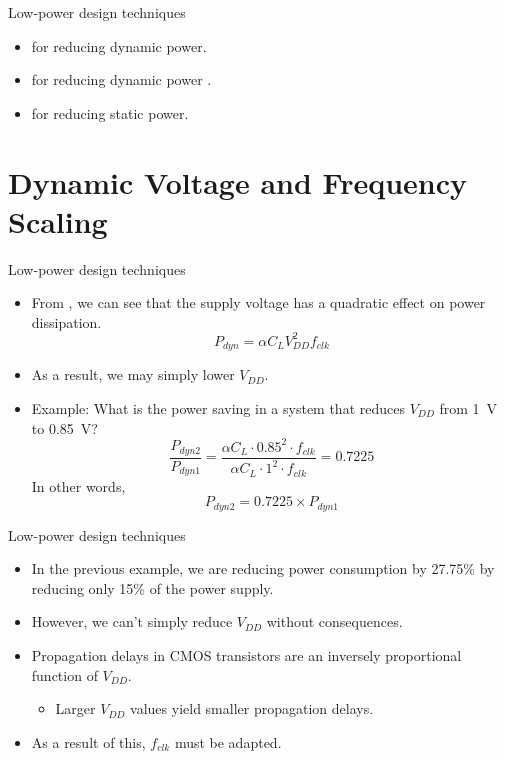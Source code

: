 \documentclass[]{slides}
\begin{document}
\begin{frame}{Low-power design techniques}{}
\begin{itemize}
\item {} for reducing dynamic power.
\item {} for reducing dynamic power .
\item {} for reducing static power.
\end{itemize}
\end{frame}

\section{Dynamic Voltage and Frequency Scaling}
\begin{frame}{Low-power design techniques}{}
\begin{itemize}
\item From , we can see that the supply voltage has a quadratic effect on power dissipation.
\begin{equation*}
P_{dyn} = \alpha C_{L} V_{DD}^{2} f_{clk}
\end{equation*}
\item[]As a result, we may simply lower $V_{DD}$.
\item Example: What is the power saving in a system that reduces $V_{DD}$ from 1~V to 0.85~V?
\pause
\begin{equation*}
\frac{P_{dyn2}}{P_{dyn1}} = \frac{\alpha C_{L} \cdot 0.85^{2} \cdot f_{clk}}{\alpha C_{L} \cdot 1^{2} \cdot f_{clk}} = 0.7225
\end{equation*}
In other words,
\begin{equation*}
P_{dyn2}= 0.7225 \times P_{dyn1} 
\end{equation*}
\end{itemize}
\end{frame}

\begin{frame}{Low-power design techniques}{}
\begin{itemize}
\item In the previous example, we are reducing power consumption by 27.75\% by reducing only 15\% of the power supply.
\item However, we can't simply reduce $V_{DD}$ without consequences.
\pause
\item Propagation delays in \acf{CMOS} transistors are an inversely proportional function of $V_{DD}$.
\begin{itemize}
  \item Larger $V_{DD}$ values yield smaller propagation delays.
\end{itemize}
\item As a result of this, $f_{clk}$ must be adapted.
\end{itemize}
\end{frame}
\end{document}
